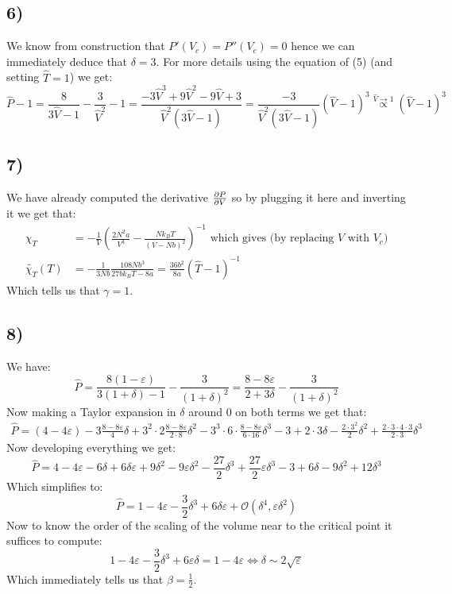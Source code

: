 \documentclass[10pt,a4paper]{book}
\begin{document}
\subsection*{6)}
We know from construction that $P'(V_c) = P''(V_c) = 0$ hence we can immediately deduce that $\delta = 3$. For more details using the equation of (5) (and setting $\hat{T} = 1$) we get:
\[
\hat{P} - 1 = \frac{8}{3 \hat{V} - 1} - \frac{3}{\hat{V}^2} - 1 = \frac{-3 \hat{V}^3 + 9 \hat{V}^2 - 9 \hat{V} + 3}{\hat{V}^2(3 \hat{V} - 1)} = \frac{-3}{\hat{V}^2(3 \hat{V} - 1)} (\hat{V} - 1)^3 \stackrel{\hat{V} \to 1}{\propto} (\hat{V} - 1)^3
\]

\subsection*{7)}
We have already computed the derivative $\pdv{P}{V}$ so by plugging it here and inverting it we get that:
\begin{align*}
\chi_T &= -\frac{1}{V}\left(\frac{2 N^2 a}{V^3} - \frac{N k_B T}{(V - N b)^2}\right)^{-1} \text{ which gives (by replacing } V \text{ with } V_c \text{)}\\
\tilde{\chi_T}(T) &= -\frac{1}{3 N b}\frac{108 N b^3}{27 b k_B T - 8 a} = \frac{36 b^2}{8 a} (\hat{T} - 1)^{-1}
\end{align*}
Which tells us that $\gamma = 1$.

\subsection*{8)}
We have:
\[
\hat{P} = \frac{8(1 - \varepsilon)}{3(1 + \delta) - 1} - \frac{3}{(1 + \delta)^2} = \frac{8 - 8 \varepsilon}{2 + 3 \delta} - \frac{3}{(1 + \delta)^2}
\]
Now making a Taylor expansion in $\delta$ around 0 on both terms we get that:
\begin{align*}
\hat{P} = (4 - 4 \varepsilon) - 3 \frac{8 - 8 \varepsilon}{4} \delta + 3^2 \cdot 2 \frac{8 - 8 \varepsilon}{2\cdot 8} \delta^2 - 3^3 \cdot 6 \cdot \frac{8 - 8 \varepsilon}{6 \cdot 16} \delta^3 - 3  + 2 \cdot 3 \delta - \frac{2 \cdot 3^2}{2} \delta^2 + \frac{2 \cdot 3 \cdot 4 \cdot 3}{2 \cdot 3} \delta^3
\end{align*}
Now developing everything we get:
\[
\hat{P} = 4 - 4\varepsilon - 6 \delta + 6 \delta \varepsilon + 9 \delta^2 - 9 \varepsilon \delta^2 - \frac{27}{2} \delta^3 + \frac{27}{2} \varepsilon \delta^3 - 3 + 6 \delta - 9 \delta^2 + 12\delta^3
\]
Which simplifies to:
\[
\hat{P} = 1 - 4 \varepsilon - \frac{3}{2} \delta^3 + 6 \delta \varepsilon + \mathcal{O}(\delta^4, \varepsilon \delta^2)
\]
Now to know the order of the scaling of the volume near to the critical point it suffices to compute:
\[
1 - 4 \varepsilon - \frac{3}{2} \delta^3 + 6 \varepsilon \delta = 1 - 4 \varepsilon \Leftrightarrow \delta \sim 2\sqrt{\varepsilon}
\]
Which immediately tells us that $\beta = \frac{1}{2}$.
\end{document}
